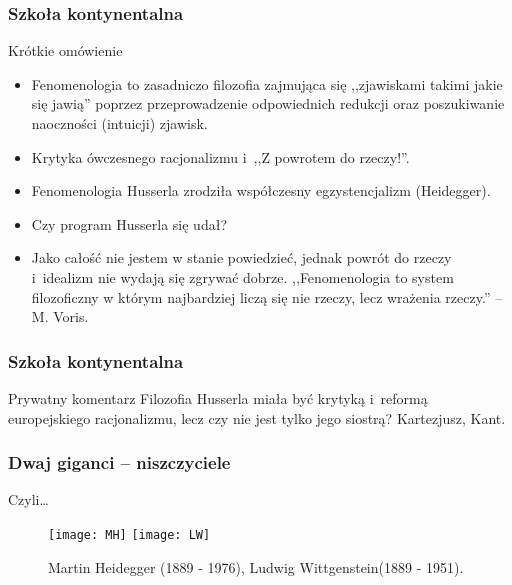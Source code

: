 \begin{frame}
\frametitle{Szkoła kontynentalna}
\begin{block}{Krótkie omówienie}
\begin{itemize}
\item Fenomenologia to zasadniczo filozofia zajmująca się ,,zjawiskami takimi jakie się jawią'' poprzez przeprowadzenie odpowiednich redukcji oraz poszukiwanie naoczności (intuicji) zjawisk.
\item Krytyka ówczesnego racjonalizmu i~,,Z powrotem do rzeczy!''.
\item Fenomenologia Husserla zrodziła współczesny egzystencjalizm (Heidegger).
\pause
\item Czy program Husserla się udał?
\pause
\item Jako całość nie jestem w stanie powiedzieć, jednak powrót do rzeczy i~idealizm nie wydają się zgrywać dobrze.
,,Fenomenologia to system filozoficzny w którym najbardziej liczą się nie rzeczy, lecz wrażenia rzeczy.'' -- M. Voris.
\end{itemize}
\end{block}

\end{frame}

\begin{frame}
\frametitle{Szkoła kontynentalna}

\begin{block}{Prywatny komentarz}
Filozofia Husserla miała być krytyką i~reformą europejskiego racjonalizmu, lecz czy nie jest tylko jego siostrą? Kartezjusz, Kant.
\end{block}
\end{frame}

\begin{frame}
\frametitle{Dwaj giganci -- niszczyciele}
\begin{block}{Czyli\ldots}
\begin{figure}
\centering
\texttt{[image: MH]}
\texttt{[image: LW]}
\pause
\caption{Martin Heidegger (1889 - 1976), Ludwig Wittgenstein\newline (1889 - 1951).}
\end{figure}
\end{block}
\end{frame}


